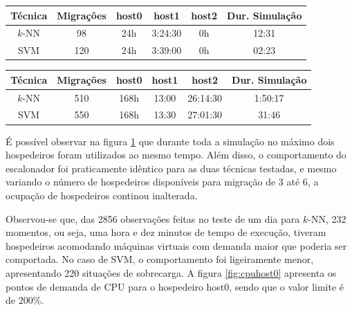 \begin{table}[htp]
\centering
\hspace{-2cm} %
\label{quadro:simula0}
\begin{tabular}{| c | c | c | c | c | c |}
\hline
Técnica & Migrações & host0  & host1   & host2 & Dur. Simulação \\
\hline
$k$-NN 	& 98        & 24h    & 3:24:30 & 0h    & 12:31  \\
\hline
SVM 	& 120       & 24h    & 3:39:00 & 0h    & 02:23  \\
\hline
\end{tabular}
\end{table}

\begin{table}[htp]
\centering
\hspace{-2cm} %
\label{quadro:simula1}
\begin{tabular}{| c | c | c | c | c | c |}
\hline
Técnica & Migrações & host0  & host1    & host2       & Dur. Simulação \\
\hline
$k$-NN 	& 510        & 168h  & 13:00    & 26:14:30    & 1:50:17  \\
\hline
SVM 	& 550        & 168h  & 13:30 	& 27:01:30    & 31:46  \\
\hline
\end{tabular}
\end{table}

É possível observar na figura \ref{fig:svmhosts} que durante toda a simulação no
máximo dois hospedeiros foram utilizados ao mesmo tempo. Além disso, o
comportamento do escalonador foi praticamente idêntico para as duas técnicas
testadas, e mesmo variando o número de hospedeiros disponíveis para migração de
3 até 6, a ocupação de hospedeiros continou inalterada.

\begin{figure}[htp]
\centering
{}
\label{fig:svmhosts}
\end{figure}

Observou-se que, das 2856 observações feitas no teste de um dia para $k$-NN, 232
momentos, ou seja, uma hora e dez minutos de tempo de execução, tiveram
hospedeiros acomodando máquinas virtuais com demanda maior que poderia ser
comportada. No caso de SVM, o comportamento foi ligeiramente menor, apresentando
220 situações de sobrecarga. A figura \ref{fig:cpuhost0} apresenta os pontos de
demanda de CPU para o hospedeiro host0, sendo que o valor limite é de 200\%.

